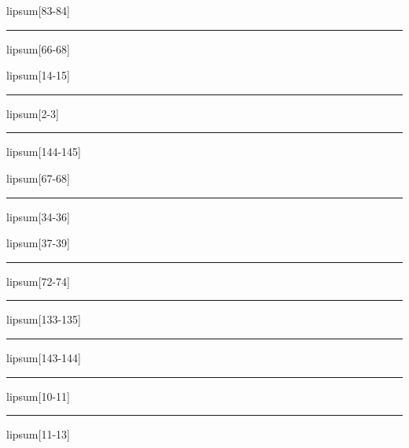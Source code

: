 \documentclass[11pt,a4paper]{article}
\begin{document}
lipsum[83-84]

\begin{simplewrap}
  \textcolor{pink!53}{\rule{3.6cm}{5.1cm}}
\end{simplewrap}
lipsum[66-68]

lipsum[14-15]

\begin{simplewrap}
  \textcolor{brown!25}{\rule{4.4cm}{4.8cm}}
\end{simplewrap}
lipsum[2-3]

\begin{simplewrap}
  \textcolor{pink!29}{\rule{5.9cm}{7.4cm}}
\end{simplewrap}
lipsum[144-145]

lipsum[67-68]

\begin{simplewrap}
  \textcolor{cyan!42}{\rule{4.5cm}{4.7cm}}
\end{simplewrap}
lipsum[34-36]

lipsum[37-39]

\begin{simplewrap}
  \textcolor{teal!17}{\rule{3.9cm}{9.8cm}}
\end{simplewrap}
lipsum[72-74]

\begin{simplewrap}
  \textcolor{olive!28}{\rule{5.7cm}{4.1cm}}
\end{simplewrap}
lipsum[133-135]

\begin{simplewrap}
  \textcolor{cyan!30}{\rule{5.2cm}{5.9cm}}
\end{simplewrap}
lipsum[143-144]

\begin{simplewrap}
  \textcolor{blue!13}{\rule{3.6cm}{2.4cm}}
\end{simplewrap}
lipsum[10-11]

\begin{simplewrap}
  \textcolor{cyan!55}{\rule{4.4cm}{2.9cm}}
\end{simplewrap}
lipsum[11-13]
\end{document}
